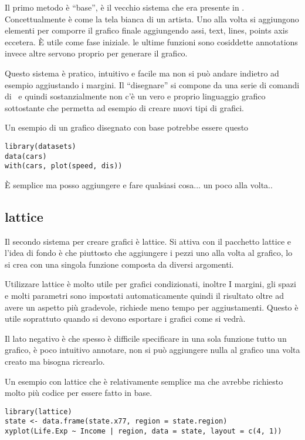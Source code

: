Il primo metodo è ``base'', è il vecchio sistema che era presente in \erre. Concettualmente è come la tela bianca di un artista. Uno alla volta si aggiungono elementi per comporre il grafico finale aggiungendo assi, text, lines, points axis eccetera. È utile come fase iniziale. le ultime funzioni sono cosiddette annotations invece altre servono proprio per generare il grafico.

Questo sistema è pratico, intuitivo e facile ma non si può andare indietro ad esempio aggiustando i margini. Il ``disegnare'' si compone da una serie di comandi di \erre\ e quindi sostanzialmente non c'è un vero e proprio linguaggio grafico sottostante che permetta ad esempio di creare nuovi tipi di grafici.

Un esempio di un grafico disegnato con base potrebbe essere questo
\begin{lstlisting}
library(datasets)
data(cars)
with(cars, plot(speed, dis))
\end{lstlisting} 

È semplice ma posso aggiungere e fare qualsiasi cosa... un poco alla volta..

\subsection{lattice}
Il secondo sistema per creare grafici è lattice. Si attiva con il pacchetto \textsf{lattice} e l'idea di fondo è che piuttosto che aggiungere i pezzi uno alla volta al grafico, lo si crea con una singola funzione composta da diversi argomenti.

Utilizzare \textsf{lattice} è molto utile per grafici condizionati, inoltre I margini, gli spazi e molti parametri sono impostati automaticamente quindi il risultato oltre ad avere un aspetto più gradevole, richiede meno tempo per aggiustamenti. Questo è utile soprattuto quando si devono esportare i grafici come si vedrà.

Il lato negativo è che spesso è difficile specificare in una sola funzione tutto un grafico, è poco intuitivo annotare, non si può aggiungere nulla al grafico una volta creato ma bisogna ricrearlo.

Un esempio con lattice che è relativamente semplice ma che avrebbe richiesto molto più codice per essere fatto in  base.
\begin{lstlisting}
library(lattice)
state <- data.frame(state.x77, region = state.region)
xyplot(Life.Exp ~ Income | region, data = state, layout = c(4, 1))
\end{lstlisting} 


